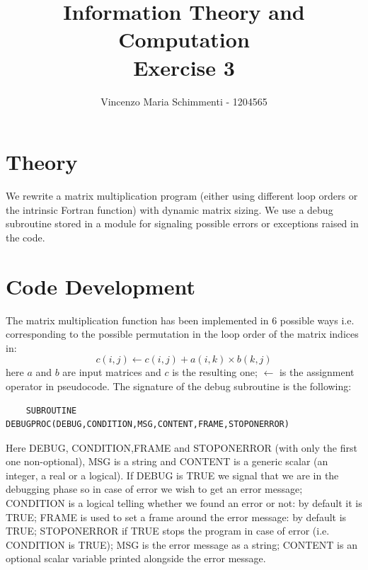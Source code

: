 \documentclass{article}
\title{%
	Information Theory and Computation \\
	Exercise  3}
\author{Vincenzo Maria Schimmenti - 1204565}
\begin{document}
\maketitle
 
\section*{Theory}
We rewrite a matrix multiplication program (either using different loop orders or the intrinsic Fortran function) with dynamic matrix sizing. We use a debug subroutine stored in a module for signaling possible errors or exceptions raised in the code. 
\section*{Code Development}
The matrix multiplication function has been implemented in $6$ possible ways i.e. corresponding to the possible permutation in the loop order of the matrix indices in:
\begin{equation}
	c(i,j) \leftarrow c(i,j) + a(i,k) \times b(k,j)
\end{equation}
here $a$ and $b$ are input matrices and $c$ is the resulting one; $\leftarrow$ is the assignment operator in pseudocode.
The signature of the debug subroutine is the following:
\begin{small}
	\begin{lstlisting}
	SUBROUTINE DEBUGPROC(DEBUG,CONDITION,MSG,CONTENT,FRAME,STOPONERROR)
	\end{lstlisting}
\end{small}
Here DEBUG, CONDITION,FRAME and STOPONERROR (with only the first one non-optional), MSG is a string and CONTENT is a generic scalar (an integer, a real or a logical). If DEBUG is TRUE we signal that we are in the debugging phase so in case of error we wish to get an error message; CONDITION is a logical telling whether we found an error or not: by default it is TRUE; FRAME is used to set a frame around the error message: by default is TRUE; STOPONERROR if TRUE stops the program in case of error (i.e. CONDITION is TRUE); MSG is the error message as a string; CONTENT is an optional scalar variable printed alongside the error message.
\end{document}
